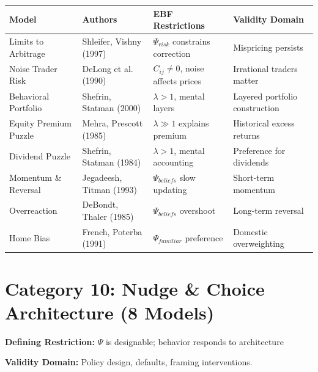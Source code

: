 \small
\begin{longtable}{@{}p{3cm}p{2.5cm}p{4cm}p{4cm}@{}}
\toprule
\textbf{Model} & \textbf{Authors} & \textbf{EBF Restrictions} & \textbf{Validity Domain} \\
\midrule
\endhead

Limits to Arbitrage & Shleifer, Vishny (1997) &
$\Psi_{risk}$ constrains correction &
Mispricing persists \\

Noise Trader Risk & DeLong et al. (1990) &
$C_{ij} \neq 0$, noise affects prices &
Irrational traders matter \\

Behavioral Portfolio & Shefrin, Statman (2000) &
$\lambda > 1$, mental layers &
Layered portfolio construction \\

Equity Premium Puzzle & Mehra, Prescott (1985) &
$\lambda \gg 1$ explains premium &
Historical excess returns \\

Dividend Puzzle & Shefrin, Statman (1984) &
$\lambda > 1$, mental accounting &
Preference for dividends \\

Momentum \& Reversal & Jegadeesh, Titman (1993) &
$\Psi_{beliefs}$ slow updating &
Short-term momentum \\

Overreaction & DeBondt, Thaler (1985) &
$\Psi_{beliefs}$ overshoot &
Long-term reversal \\

Home Bias & French, Poterba (1991) &
$\Psi_{familiar}$ preference &
Domestic overweighting \\

\bottomrule
\end{longtable}
\normalsize

\section{Category 10: Nudge \& Choice Architecture (8 Models)}
\label{sec:ms-nudge}

\begin{tcolorbox}[colback=gray!5!white, colframe=gray!75!black,
    title=\textbf{Nudge: The Context Design Extension}]

\textbf{Defining Restriction:} $\Psi$ is designable; behavior responds to architecture

\textbf{Validity Domain:} Policy design, defaults, framing interventions.

\end{tcolorbox}

